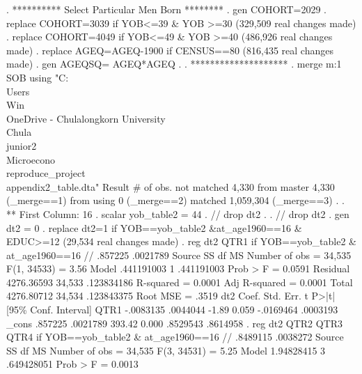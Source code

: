 . **********  Select Particular Men Born ********
. gen COHORT=2029
{\smallskip}
. replace COHORT=3039 if YOB<=39 \& YOB >=30
(329,509 real changes made)
{\smallskip}
. replace COHORT=4049 if YOB<=49 \& YOB >=40
(486,926 real changes made)
{\smallskip}
. replace AGEQ=AGEQ-1900 if CENSUS==80
(816,435 real changes made)
{\smallskip}
. gen AGEQSQ= AGEQ*AGEQ
{\smallskip}
. 
. ********************
. merge m:1 SOB using "C:\\Users\\Win\\OneDrive - Chulalongkorn University\\Chula\\junior2\\Microecono\\reproduce_project\\appendix2_table.dta"
{\smallskip}
    Result                           \# of obs.
    not matched                         4,330
        from master                     4,330  (_merge==1)
        from using                          0  (_merge==2)
{\smallskip}
    matched                         1,059,304  (_merge==3)
{\smallskip}
. 
. ** First Column: 16
. scalar yob_table2 = 44
{\smallskip}
. // drop dt2
. 
. // drop dt2
. gen dt2 = 0
{\smallskip}
. replace dt2=1 if YOB==yob_table2 \&at_age1960==16 \& EDUC>=12
(29,534 real changes made)
{\smallskip}
. reg dt2 QTR1 if YOB==yob_table2  \& at_age1960==16 // .857225   .0021789
{\smallskip}
      Source {\VBAR}       SS           df       MS      Number of obs   =    34,535
   F(1, 34533)     =      3.56
       Model {\VBAR}  .441191003         1  .441191003   Prob > F        =    0.0591
    Residual {\VBAR}  4276.36593    34,533  .123834186   R-squared       =    0.0001
   Adj R-squared   =    0.0001
       Total {\VBAR}  4276.80712    34,534  .123843375   Root MSE        =     .3519
{\smallskip}
         dt2 {\VBAR}      Coef.   Std. Err.      t    P>|t|     [95\% Conf. Interval]
        QTR1 {\VBAR}  -.0083135   .0044044    -1.89   0.059    -.0169464    .0003193
       _cons {\VBAR}    .857225   .0021789   393.42   0.000     .8529543    .8614958
{\smallskip}
. reg dt2 QTR2 QTR3 QTR4 if YOB==yob_table2  \& at_age1960==16 // .8489115   .0038272
{\smallskip}
      Source {\VBAR}       SS           df       MS      Number of obs   =    34,535
   F(3, 34531)     =      5.25
       Model {\VBAR}  1.94828415         3  .649428051   Prob > F        =    0.0013

